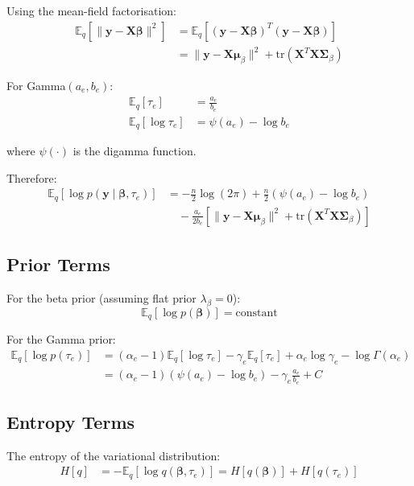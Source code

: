 \documentclass[11pt]{article}
\newcommand{\E}{\mathbb{E}}
\newcommand{\tr}{\text{tr}}
\begin{document}
Using the mean-field factorisation:
\begin{align}
\E_q[\|\bm{y} - \bm{X}\bm{\beta}\|^2] &= \E_q[(\bm{y} - \bm{X}\bm{\beta})^T(\bm{y} - \bm{X}\bm{\beta})] \nonumber\\
&= \|\bm{y} - \bm{X}\bm{\mu}_\beta\|^2 + \tr(\bm{X}^T\bm{X}\bm{\Sigma}_\beta)
\end{align}

For Gamma$(a_e, b_e)$:
\begin{align}
\E_q[\tau_e] &= \frac{a_e}{b_e}\\
\E_q[\log \tau_e] &= \psi(a_e) - \log b_e
\end{align}

where $\psi(\cdot)$ is the digamma function.

Therefore:
\begin{align}
\E_{q}[\log p(\bm{y} \mid \bm{\beta}, \tau_e)] &= -\frac{n}{2}\log(2\pi) + \frac{n}{2}(\psi(a_e) - \log b_e) \nonumber\\
&\quad - \frac{a_e}{2b_e} \left[\|\bm{y} - \bm{X}\bm{\mu}_\beta\|^2 + \tr(\bm{X}^T\bm{X}\bm{\Sigma}_\beta)\right]
\label{eq:exp_likelihood}
\end{align}

\subsection{Prior Terms}

For the beta prior (assuming flat prior $\lambda_\beta = 0$):
\begin{equation}
\E_{q}[\log p(\bm{\beta})] = \text{constant}
\end{equation}

For the Gamma prior:
\begin{align}
\E_{q}[\log p(\tau_e)] &= (\alpha_e - 1)\E_q[\log \tau_e] - \gamma_e \E_q[\tau_e] + \alpha_e \log \gamma_e - \log \Gamma(\alpha_e) \nonumber\\
&= (\alpha_e - 1)(\psi(a_e) - \log b_e) - \gamma_e \frac{a_e}{b_e} + C
\label{eq:exp_prior_tau}
\end{align}

\subsection{Entropy Terms}

The entropy of the variational distribution:
\begin{align}
H[q] &= -\E_q[\log q(\bm{\beta}, \tau_e)] = H[q(\bm{\beta})] + H[q(\tau_e)]
\end{align}
\end{document}
